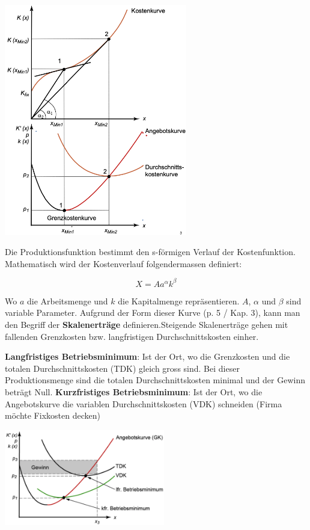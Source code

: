 \documentclass[9pt, landscape, fleqn]{scrartcl}
\begin{document}
\begin{multicols*}{3}
\begin{center}
    \includegraphics[width=8cm]{S-Foermiger-Kostenverlauf.png}
\end{center}

Die Produktionsfunktion bestimmt den s-förmigen Verlauf der Kostenfunktion. Mathematisch wird der Kostenverlauf folgendermassen definiert: 

\begin{equation}
    X = A a^\alpha k^\beta
\end{equation}

Wo $a$ die Arbeitsmenge und $k$ die Kapitalmenge repräsentieren. $A$, $\alpha$ und $\beta$ sind variable Parameter. 
Aufgrund der Form dieser Kurve (p. 5 / Kap. 3), kann man den Begriff der \textbf{Skalenerträge} definieren.Steigende Skalenerträge gehen mit fallenden Grenzkosten
bzw. langfristigen Durchschnittskosten einher. \newline \newline

\textbf{Langfristiges Betriebsminimum}: Ist der Ort, wo die Grenzkosten und die totalen Durchschnittskosten (TDK) gleich gross sind. Bei dieser Produktionsmenge sind die totalen Durchschnittskosten minimal und der Gewinn beträgt Null. \newline \newline
\textbf{Kurzfristiges Betriebsminimum}: Ist der Ort, wo die Angebotskurve die variablen Durchschnittskosten (VDK) schneiden (Firma möchte Fixkosten decken)

\begin{center}
    \includegraphics[width=7cm]{Betriebsminima.png}    
\end{center}




\end{multicols*}
\end{document}

